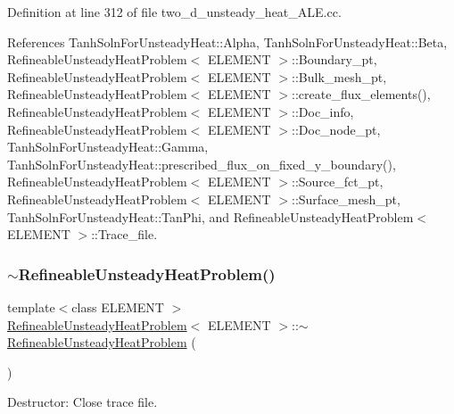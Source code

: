 Definition at line 312 of file two\+\_\+d\+\_\+unsteady\+\_\+heat\+\_\+\+A\+L\+E.\+cc.



References Tanh\+Soln\+For\+Unsteady\+Heat\+::\+Alpha, Tanh\+Soln\+For\+Unsteady\+Heat\+::\+Beta, Refineable\+Unsteady\+Heat\+Problem$<$ E\+L\+E\+M\+E\+N\+T $>$\+::\+Boundary\+\_\+pt, Refineable\+Unsteady\+Heat\+Problem$<$ E\+L\+E\+M\+E\+N\+T $>$\+::\+Bulk\+\_\+mesh\+\_\+pt, Refineable\+Unsteady\+Heat\+Problem$<$ E\+L\+E\+M\+E\+N\+T $>$\+::create\+\_\+flux\+\_\+elements(), Refineable\+Unsteady\+Heat\+Problem$<$ E\+L\+E\+M\+E\+N\+T $>$\+::\+Doc\+\_\+info, Refineable\+Unsteady\+Heat\+Problem$<$ E\+L\+E\+M\+E\+N\+T $>$\+::\+Doc\+\_\+node\+\_\+pt, Tanh\+Soln\+For\+Unsteady\+Heat\+::\+Gamma, Tanh\+Soln\+For\+Unsteady\+Heat\+::prescribed\+\_\+flux\+\_\+on\+\_\+fixed\+\_\+y\+\_\+boundary(), Refineable\+Unsteady\+Heat\+Problem$<$ E\+L\+E\+M\+E\+N\+T $>$\+::\+Source\+\_\+fct\+\_\+pt, Refineable\+Unsteady\+Heat\+Problem$<$ E\+L\+E\+M\+E\+N\+T $>$\+::\+Surface\+\_\+mesh\+\_\+pt, Tanh\+Soln\+For\+Unsteady\+Heat\+::\+Tan\+Phi, and Refineable\+Unsteady\+Heat\+Problem$<$ E\+L\+E\+M\+E\+N\+T $>$\+::\+Trace\+\_\+file.

\mbox{\label{classRefineableUnsteadyHeatProblem_a975e00f5e87d77b4e1bf4d50482dea2b}} 
\subsubsection{\texorpdfstring{$\sim$\+Refineable\+Unsteady\+Heat\+Problem()}{~RefineableUnsteadyHeatProblem()}}
{\footnotesize\ttfamily template$<$class E\+L\+E\+M\+E\+NT $>$ \\
\hyperlink{classRefineableUnsteadyHeatProblem}{Refineable\+Unsteady\+Heat\+Problem}$<$ E\+L\+E\+M\+E\+NT $>$\+::$\sim$\hyperlink{classRefineableUnsteadyHeatProblem}{Refineable\+Unsteady\+Heat\+Problem} (\begin{DoxyParamCaption}{ }\end{DoxyParamCaption})}



Destructor\+: Close trace file. 



